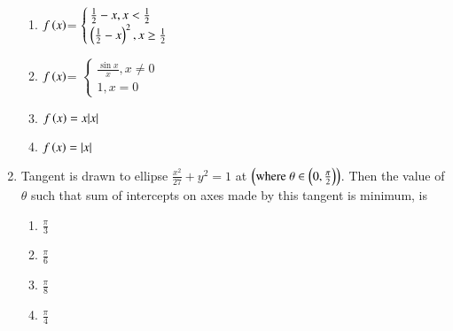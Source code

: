 \documentclass[journal]{IEEEtran}
\begin{document}
\begin{enumerate}[start=9]
\begin{enumerate}
    \item $f\left(x\right)$=
    $\begin{cases}
         \frac{1}{2}-x, x<\frac{1}{2}\\
        \left(\frac{1}{2}-x\right)^2, x\geq \frac{1}{2}
    \end{cases}$\\
     \item $f\left(x\right)$=
    $\begin{cases}
        \frac{\sin x}{x}, x\neq 0\\
        1, x=0
    \end{cases}$\\
    \item $f\left(x\right)=x|x|$
    \item $f\left(x\right)= |x|$\\
\end{enumerate}
\item Tangent is drawn to ellipse $\frac{x^2}{27}+y^2 = 1$ at $\left(\text{where } \theta \in  \left(0,\frac{\pi}{2}\right)\right)$. Then the value of $\theta$ such that sum of intercepts on axes made by this tangent is minimum, is
\hfill {}
\begin{multicols}{4}
\begin{enumerate}
    \item $\frac{\pi}{3}$\\
    \item $\frac{\pi}{6}$\\
    \item $\frac{\pi}{8}$\\
    \item $\frac{\pi}{4}$\\
 \end{enumerate}
\end{multicols}
\end{enumerate}
\end{document}
